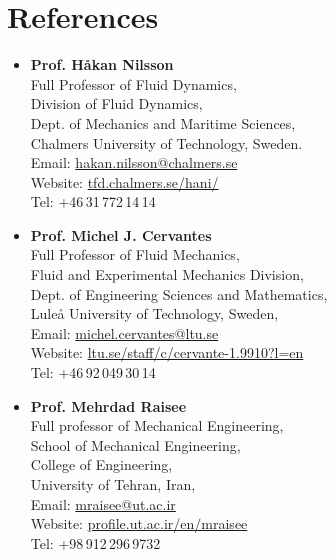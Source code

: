 \section*{References}{}

\begin{itemize}
    \item \textbf{Prof. H\aa kan Nilsson}\\
    Full Professor of Fluid Dynamics,\\
    Division of Fluid Dynamics,\\
    Dept. of Mechanics and Maritime Sciences,\\
    Chalmers University of Technology, Sweden.\\
    Email: \href{mailto:hakan.nilsson@chalmers.se}{hakan.nilsson@chalmers.se}\\
    Website: \href{http://www.tfd.chalmers.se/~hani/}{tfd.chalmers.se/{\texttildelow}hani/}\\
    Tel: +46\,31\,772\,14\,14

    \item \textbf{Prof. Michel J. Cervantes}\\
    Full Professor of Fluid Mechanics,\\
    Fluid and Experimental Mechanics Division,\\
    Dept. of Engineering Sciences and Mathematics,\\
    Lule\r{a} University of Technology, Sweden,\\
    Email: \href{mailto:michel.cervantes@ltu.se}{michel.cervantes@ltu.se}\\	
    Website: \href{https://www.ltu.se/staff/c/cervante-1.9910?l=enb}{ltu.se/staff/c/cervante-1.9910?l=en}\\	
    Tel: +46\,92\,049\,30\,14
    
    \item \textbf{Prof. Mehrdad Raisee}\\
    Full professor of Mechanical Engineering,\\
    School of Mechanical Engineering,\\
    College of Engineering,\\
    University of Tehran, Iran,\\
    Email: \href{mailto:mraisee@ut.ac.ir}{mraisee@ut.ac.ir}\\
    Website: \href{https://profile.ut.ac.ir/en/~mraisee}{profile.ut.ac.ir/en/{\texttildelow}mraisee}\\
    Tel: +98\,912\,296\,9732


\end{itemize}
